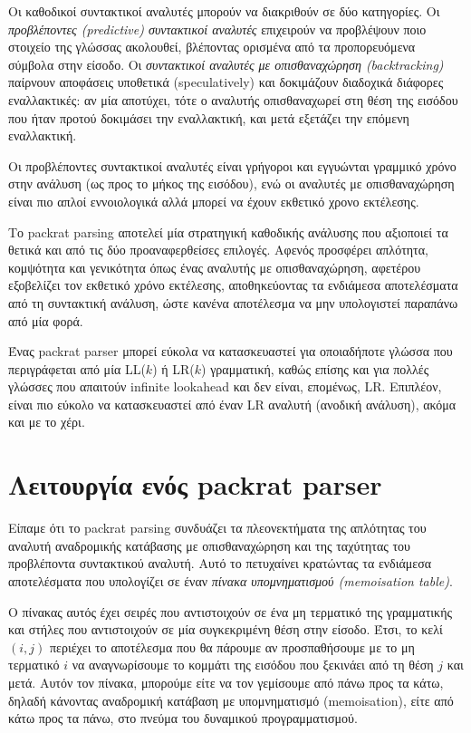 \documentclass[diploma]{softlab-thesis}
\begin{document}
Οι καθοδικοί συντακτικοί αναλυτές μπορούν να διακριθούν σε δύο κατηγορίες. Οι \textit{προβλέποντες (predictive) συντακτικοί αναλυτές} επιχειρούν να προβλέψουν ποιο στοιχείο της γλώσσας ακολουθεί, βλέποντας ορισμένα από τα προπορευόμενα σύμβολα στην είσοδο.
Οι \textit{συντακτικοί αναλυτές με οπισθαναχώρηση (backtracking)} παίρνουν αποφάσεις υποθετικά (speculatively) και δοκιμάζουν διαδοχικά διάφορες εναλλακτικές: αν μία αποτύχει, τότε ο αναλυτής οπισθαναχωρεί στη θέση της εισόδου που ήταν προτού δοκιμάσει την εναλλακτική, και μετά εξετάζει την επόμενη εναλλακτική. 

Οι προβλέποντες συντακτικοί αναλυτές είναι γρήγοροι και εγγυώνται γραμμικό χρόνο στην ανάλυση (ως προς το μήκος της εισόδου), ενώ οι αναλυτές με οπισθαναχώρηση είναι πιο απλοί εννοιολογικά αλλά μπορεί να έχουν εκθετικό χρονο εκτέλεσης.

Το packrat parsing αποτελεί μία στρατηγική καθοδικής ανάλυσης που αξιοποιεί τα θετικά και από τις δύο προαναφερθείσες επιλογές. 
Αφενός προσφέρει απλότητα, κομψότητα και γενικότητα όπως ένας αναλυτής με οπισθαναχώρηση, αφετέρου εξοβελίζει τον εκθετικό χρόνο εκτέλεσης, αποθηκεύοντας τα ενδιάμεσα αποτελέσματα από τη συντακτική ανάλυση, ώστε κανένα αποτέλεσμα να μην υπολογιστεί παραπάνω από μία φορά.

Ένας packrat parser μπορεί εύκολα να κατασκευαστεί για οποιαδήποτε γλώσσα που περιγράφεται από μία LL($k$) ή LR($k$) γραμματική, καθώς επίσης και για πολλές γλώσσες που απαιτούν infinite lookahead και δεν είναι, επομένως, LR.
Επιπλέον, είναι πιο εύκολο να κατασκευαστεί από έναν LR αναλυτή (ανοδική ανάλυση), ακόμα και με το χέρι.

\section{Λειτουργία ενός packrat parser}

Είπαμε ότι το packrat parsing συνδυάζει τα πλεονεκτήματα της απλότητας του αναλυτή αναδρομικής κατάβασης με οπισθαναχώρηση και της ταχύτητας του προβλέποντα συντακτικού αναλυτή. 
Αυτό το πετυχαίνει κρατώντας τα ενδιάμεσα αποτελέσματα που υπολογίζει σε έναν \textit{πίνακα υπομνηματισμού (memoisation table)}.

Ο πίνακας αυτός έχει σειρές που αντιστοιχούν σε ένα μη τερματικό της γραμματικής και στήλες που αντιστοιχούν σε μία συγκεκριμένη θέση στην είσοδο. Έτσι, το κελί $(i, j)$ περιέχει το αποτέλεσμα που θα πάρουμε αν προσπαθήσουμε με το μη τερματικό $i$ να αναγνωρίσουμε το κομμάτι της εισόδου που ξεκινάει από τη θέση $j$ και μετά. 
Αυτόν τον πίνακα, μπορούμε είτε να τον γεμίσουμε από πάνω προς τα κάτω, δηλαδή κάνοντας αναδρομική κατάβαση με υπομνηματισμό (memoisation), είτε από κάτω προς τα πάνω, στο πνεύμα του δυναμικού προγραμματισμού.
\end{document}
